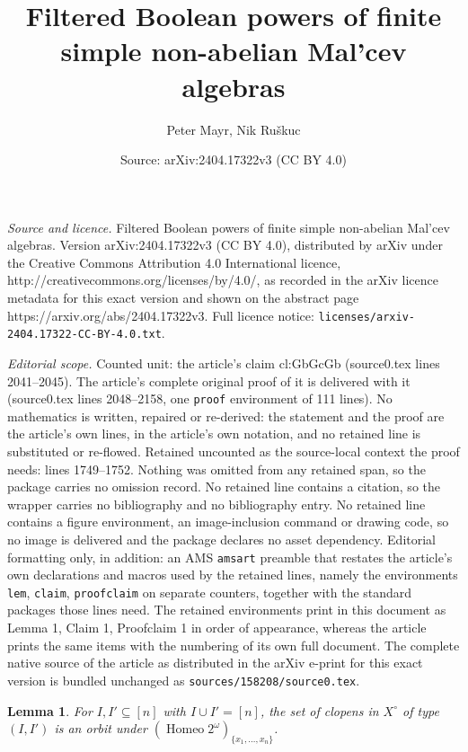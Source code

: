 \documentclass[10pt,a4paper]{amsart}
\title{Filtered Boolean powers of finite simple non-abelian Mal'cev algebras}
\author{Peter Mayr, Nik Ru{\v s}kuc}
\date{Source: arXiv:2404.17322v3 (CC BY 4.0)}
\newtheorem{lem}{Lemma}
\DeclareMathOperator{\Homeo}{Homeo}
\begin{document}
\maketitle

\noindent\emph{Source and licence.} Filtered Boolean powers of finite simple non-abelian Mal'cev algebras. Version arXiv:2404.17322v3 (CC BY 4.0), distributed by arXiv under the Creative Commons Attribution 4.0 International licence, http://creativecommons.org/licenses/by/4.0/, as recorded in the arXiv licence metadata for this exact version and shown on the abstract page https://arxiv.org/abs/2404.17322v3. Full licence notice: \texttt{licenses/arxiv-2404.17322-CC-BY-4.0.txt}.\par\smallskip

\noindent\textit{Editorial scope.} Counted unit: the article's claim cl:GbGcGb (source0.tex lines 2041--2045). The article's complete original proof of it is delivered with it (source0.tex lines 2048--2158, one \texttt{proof} environment of 111 lines). No mathematics is written, repaired or re-derived: the statement and the proof are the article's own lines, in the article's own notation, and no retained line is substituted or re-flowed.  Retained uncounted as the source-local context the proof needs: lines 1749--1752.  Nothing was omitted from any retained span, so the package carries no omission record.  No retained line contains a citation, so the wrapper carries no bibliography and no bibliography entry.  No retained line contains a figure environment, an image-inclusion command or drawing code, so no image is delivered and the package declares no asset dependency.  Editorial formatting only, in addition: an AMS \texttt{amsart} preamble that restates the article's own declarations and macros used by the retained lines, namely the environments \texttt{lem}, \texttt{claim}, \texttt{proofclaim} on separate counters, together with the standard packages those lines need.  The retained environments print in this document as Lemma 1, Claim 1, Proofclaim 1 in order of appearance, whereas the article prints the same items with the numbering of its own full document.  The complete native source of the article as distributed in the arXiv e-print for this exact version is bundled unchanged as \texttt{sources/158208/source0.tex}.
\begin{lem} \label{lem:types}
 For $I,I'\subseteq [n]$ with $I\cup I'=[n]$, the set of clopens in $X^\circ$ of type $(I,I')$ is an orbit under
 $(\Homeo 2^\omega)_{\{x_1,\dots,x_n\}}$.  
\end{lem}
\end{document}
